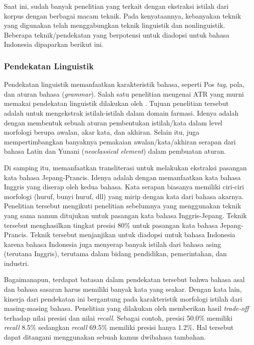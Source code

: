 \documentclass[../main/main.tex]{subfiles}
\begin{document}
Saat ini, sudah banyak penelitian yang terkait dengan ekstraksi istilah dari korpus dengan berbagai macam teknik. Pada kenyataannya, kebanyakan teknik yang digunakan telah menggabungkan teknik linguistik dan nonlinguistik. Beberapa teknik/pendekatan yang berpotensi untuk diadopsi untuk bahasa Indonesia dipaparkan berikut ini.

\subsubsection{Pendekatan Linguistik}
\label{subsubbab:studi_linguistik}
Pendekatan linguistik memanfaatkan karakteristik bahasa, seperti Pos \textit{tag}, pola, dan aturan bahasa (\textit{grammar}). Salah satu penelitian mengenai ATR yang murni memakai pendekatan linguistik dilakukan oleh \textcite{ananiadou}. Tujuan penelitian tersebut adalah untuk mengekstrak istilah-istilah dalam domain farmasi. Idenya adalah dengan membentuk sebuah aturan pembentukan istilah/kata dalam level morfologi berupa awalan, akar kata, dan akhiran. Selain itu, \textcite{ananiadou} juga mempertimbangkan banyaknya pemakaian awalan/kata/akhiran serapan dari bahasa Latin dan Yunani (\textit{neoclassical element}) dalam pembuatan aturan.

Di samping itu, \textcite{tsuji} memanfaatkan transliterasi untuk melakukan ekstraksi pasangan kata bahasa Jepang-Prancis. Idenya adalah dengan memanfaatkan kata bahasa Inggris yang diserap oleh kedua bahasa. Kata serapan biasanya memiliki ciri-ciri morfologi (huruf, bunyi huruf, dll) yang mirip dengan kata dari bahasa akarnya. Penelitian tersebut mengikuti penelitian sebelumnya yang menggunakan teknik yang sama namun ditujukan untuk pasangan kata bahasa Inggris-Jepang. Teknik tersebut menghasilkan tingkat presisi 80\% untuk pasangan kata bahasa Jepang-Prancis. Teknik tersebut menjanjikan untuk diadopsi untuk bahasa Indonesia karena bahasa Indonesia juga menyerap banyak istilah dari bahasa asing (terutana Inggris), terutama dalam bidang pendidikan, pemerintahan, dan industri.

Bagaimanapun, terdapat batasan dalam pendekatan tersebut bahwa bahasa asal dan bahasa sasaran harus memiliki banyak kata yang seakar. Dengan kata lain, kinerja dari pendekatan ini bergantung pada karakteristik morfologi istilah dari masing-masing bahasa. Penelitian yang dilakukan oleh \textcite{fujii} memberikan hasil \textit{trade-off} terhadap nilai presisi dan nilai \textit{recall}. Sebagai contoh, presisi 50.0\% memiliki \textit{recall} 8.5\% sedangkan \textit{recall} 69.5\% memiliki presisi hanya 1.2\%. Hal tersebut dapat ditangani menggunakan sebuah kamus dwibahasa tambahan.
\end{document}
